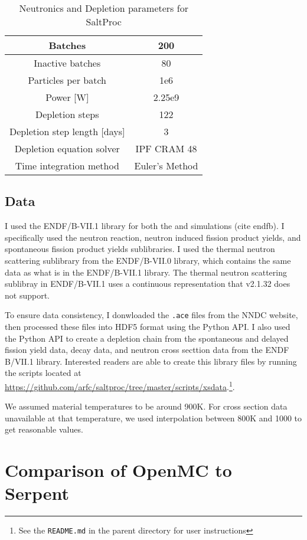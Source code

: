 \begin{table}[htpb] 
    \centering 
    \caption{Neutronics and Depletion parameters for SaltProc}
    \label{tab:saltproc-params}
    \begin{tabular}{|c|c|} 
        \hline
        Batches & 200 \\
        \hline
        Inactive batches & 80 \\
        \hline
        Particles per batch & 1e6 \\
        \hline
        Power [W] & 2.25e9 \\
        \hline
        Depletion steps & 122 \\
        \hline
        Depletion step length [days] & 3 \\
        \hline
        Depletion equation solver & IPF CRAM 48 \\
        \hline
        Time integration method & Euler's Method \\
        \hline
    \end{tabular}
\end{table}

\subsection{Data}
\label{sub:results-xs-data}

I used the ENDF/B-VII.1 library for both the \SerpentTWO and
\OpenMC simulations (cite endfb). I specifically used the neutron reaction,
neutron induced fission product yields, and spontaneous fission product yields
sublibraries. I used the thermal neutron scattering sublibrary from the
ENDF/B-VII.0 library, which contains the same data as what is in the
ENDF/B-VII.1 library. The thermal neutron scattering sublibray in ENDF/B-VII.1
uses a continuous representation that \SerpentTWO v2.1.32 does not support.

To ensure data consistency, I donwloaded the \verb,.ace, files from the NNDC
website, then processed these files into HDF5 format using the \OpenMC Python
API. I also used the Python API to create a depletion chain from the
spontaneous and delayed fission yield data, decay data, and neutron cross
secttion data from the ENDF B/VII.1 library. Interested readers are able to
create this library files by running the scripts located at
\url{https://github.com/arfc/saltproc/tree/master/scripts/xsdata}.\footnote{See
the \verb,README.md, in the parent directory for user instructions}.

We assumed material temperatures to be around 900K. For cross section data
unavailable at that temperature, we used interpolation between 800K and 1000
to get reasonable values.
 

\section{Comparison of OpenMC to Serpent}
\label{sec:openmc-vs-serpent}

